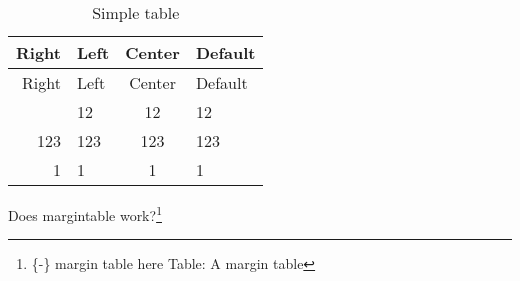 \documentclass{article}
\begin{document}
\begin{longtable}[]{@{}rlcl@{}}
\caption{Simple table}\tabularnewline
\toprule\noalign{}
Right & Left & Center & Default \\
\midrule\noalign{}
\endfirsthead
\toprule\noalign{}
Right & Left & Center & Default \\
\midrule\noalign{}
\endhead
\bottomrule\noalign{}
\endlastfoot
12 & 12 & 12 & 12 \\
123 & 123 & 123 & 123 \\
1 & 1 & 1 & 1 \\
\end{longtable}

Does margintable work?\footnote{\{-\} margin table here Table: A margin
  table}
\end{document}
